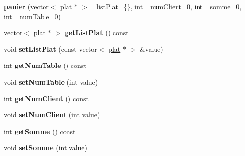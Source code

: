 \begin{DoxyCompactItemize}
\item 
{\bfseries panier} (vector$<$ \hyperlink{classplat}{plat} $\ast$ $>$ \+\_\+list\+Plat=\{\}, int \+\_\+num\+Client=0, int \+\_\+somme=0, int \+\_\+num\+Table=0)\hypertarget{classpanier_ac95e53b14831508e576d6fe9ea6ca4d0}{}\label{classpanier_ac95e53b14831508e576d6fe9ea6ca4d0}

\item 
vector$<$ \hyperlink{classplat}{plat} $\ast$ $>$ {\bfseries get\+List\+Plat} () const \hypertarget{classpanier_a76c516370e2deea1b99cd61693e098d2}{}\label{classpanier_a76c516370e2deea1b99cd61693e098d2}

\item 
void {\bfseries set\+List\+Plat} (const vector$<$ \hyperlink{classplat}{plat} $\ast$ $>$ \&value)\hypertarget{classpanier_a22148a0f1c97ccd16b91b5d5c6945dde}{}\label{classpanier_a22148a0f1c97ccd16b91b5d5c6945dde}

\item 
int {\bfseries get\+Num\+Table} () const \hypertarget{classpanier_a670beac1f516240ffecbd72ba832b24b}{}\label{classpanier_a670beac1f516240ffecbd72ba832b24b}

\item 
void {\bfseries set\+Num\+Table} (int value)\hypertarget{classpanier_aa2359acb3f72648b3cccfdba0b3417cb}{}\label{classpanier_aa2359acb3f72648b3cccfdba0b3417cb}

\item 
int {\bfseries get\+Num\+Client} () const \hypertarget{classpanier_a33b13ebeab9d67cd47d4e8b824bc7804}{}\label{classpanier_a33b13ebeab9d67cd47d4e8b824bc7804}

\item 
void {\bfseries set\+Num\+Client} (int value)\hypertarget{classpanier_a21c30ce458e025d8e5928c3524d23c82}{}\label{classpanier_a21c30ce458e025d8e5928c3524d23c82}

\item 
int {\bfseries get\+Somme} () const \hypertarget{classpanier_a19af7f142c7c34154dd79f4d5e047b01}{}\label{classpanier_a19af7f142c7c34154dd79f4d5e047b01}

\item 
void {\bfseries set\+Somme} (int value)\hypertarget{classpanier_abab52c08e4aa915aab3401313beca893}{}\label{classpanier_abab52c08e4aa915aab3401313beca893}

\end{DoxyCompactItemize}
